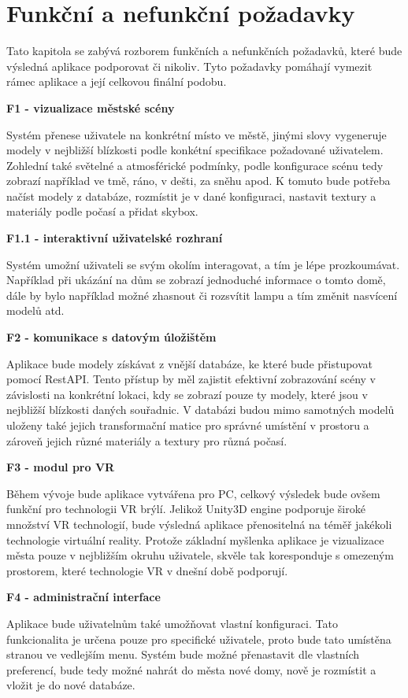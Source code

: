 \documentclass[thesis=B,czech]{FITthesis}[2012/06/26]
\begin{document}
	\section{Funkční a nefunkční požadavky}
	Tato kapitola se zabývá rozborem funkčních a nefunkčních požadavků, které bude výsledná aplikace podporovat či nikoliv. Tyto požadavky pomáhají vymezit rámec aplikace a její celkovou finální podobu.
	\begin{description}
	
 		\item \textbf{F1 - vizualizace městské scény}
 		 			
 			Systém přenese uživatele na konkrétní místo ve městě, jinými slovy vygeneruje modely v nejbližší blízkosti podle konkétní specifikace požadované uživatelem. Zohlední také světelné a atmosférické podmínky, podle konfigurace scénu tedy zobrazí například ve tmě, ráno, v dešti, za sněhu apod. K tomuto bude potřeba načíst modely z databáze, rozmístit je v dané konfiguraci, nastavit textury a materiály podle počasí a přidat skybox.

 		\item \textbf{F1.1 - interaktivní uživatelské rozhraní}
 		
 		Systém umožní uživateli se svým okolím interagovat, a tím je lépe prozkoumávat. Například při ukázání na dům se zobrazí jednoduché informace o tomto domě, dále by bylo například možné zhasnout či rozsvítit lampu a tím změnit nasvícení modelů atd.
 		
 		\item \textbf{F2 - komunikace s datovým úložištěm}
 		
 		Aplikace bude modely získávat z vnější databáze, ke které bude přistupovat pomocí RestAPI. Tento přístup by měl zajistit efektivní zobrazování scény v závislosti na konkrétní lokaci, kdy se zobrazí pouze ty modely, které jsou v nejbližší blízkosti daných souřadnic. V databázi budou mimo samotných modelů uloženy také jejich transformační matice pro správné umístění v prostoru a zároveň jejich různé materiály a textury pro různá počasí.
 		
 		\item \textbf{F3 - modul pro VR}
 		
 		Během vývoje bude aplikace vytvářena pro PC, celkový výsledek bude ovšem funkční pro technologii VR brýlí. Jelikož Unity3D engine podporuje široké množství VR technologií, bude výsledná aplikace přenositelná na téměř jakékoli technologie virtuální reality. Protože základní myšlenka aplikace je vizualizace města pouze v nejbližším okruhu uživatele, skvěle tak koresponduje s omezeným prostorem, které technologie VR v dnešní době podporují.
 		
 		\item \textbf{F4 - administrační interface}
 		
 		Aplikace bude uživatelnům také umožňovat vlastní konfiguraci. Tato funkcionalita je určena pouze pro specifické uživatele, proto bude tato umístěna stranou ve vedlejším menu. Systém bude možné přenastavit dle vlastních preferencí, bude tedy možné nahrát do města nové domy, nově je rozmístit a vložit je do nové databáze.
 		
 	\end{description}	
	
\end{document}
